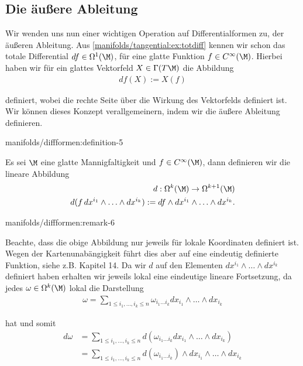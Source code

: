 \documentclass[letterpaper,10pt,german]{jupyterBook}
\begin{document}
\subsection{Die äußere Ableitung}
\label{\detokenize{manifolds/diffformen:die-auszere-ableitung}}
\par
Wir wenden uns nun einer wichtigen Operation auf Differentialformen zu, der äußeren Ableitung. Aus \cref{manifolds/tangential:ex:totdiff} kennen wir schon das totale Differential \(df\in \Omega^1(\M)\), für eine glatte Funktion \(f\in C^\infty(\M)\). Hierbei haben wir für ein glattes Vektorfeld \(X\in \Gamma(T\M)\) die Abbildung
\begin{align*}
df(X) := X(f)
\end{align*}
\par
definiert, wobei die rechte Seite über die Wirkung des Vektorfelds definiert ist. Wir können dieses Konzept verallgemeinern, indem wir die äußere Ableitung definieren.
\begin{definition}{}{manifolds/diffformen:definition-5}



\par
Es sei \(\M\) eine glatte Mannigfaltigkeit und \(f\in C^\infty(\M)\), dann definieren wir die lineare Abbildung
\begin{align*}
d:\Omega^k(\M)\to \Omega^{k+1}(\M)\\
d(f\, dx^{i_1}\wedge\ldots\wedge dx^{i_k}):= df \wedge dx^{i_1}\wedge\ldots\wedge dx^{i_k}.
\end{align*}\end{definition}
\begin{remark}{}{manifolds/diffformen:remark-6}



\par
Beachte, dass die obige Abbildung nur jeweils für lokale Koordinaten definiert ist. Wegen der Kartenunabängigkeit führt dies aber auf eine eindeutig definierte Funktion, siehe z.B. \cite{Lee03} Kapitel 14. Da wir \(d\) auf den Elementen \(dx^{i_1}\wedge\ldots\wedge dx^{i_k}\) definiert haben erhalten wir jeweils lokal eine eindeutige lineare Fortsetzung, da jedes \(\omega\in \Omega^k(\M)\) lokal die Darstellung
\begin{align*}
\omega = \sum_{1\leq i_1,\ldots,i_k \leq n}\omega_{i_1\ldots i_k}
dx_{i_1}\wedge\ldots\wedge dx_{i_k}
\end{align*}
\par
hat und somit
\begin{align*}
d\omega &= \sum_{1\leq i_1,\ldots,i_k \leq n} d(\omega_{i_1\ldots i_k}
dx_{i_1}\wedge\ldots\wedge dx_{i_k})\\ 
&= \sum_{1\leq i_1,\ldots,i_k \leq n} d(\omega_{i_1\ldots i_k})\wedge
dx_{i_1}\wedge\ldots\wedge dx_{i_k}
\end{align*}\end{remark}
\end{document}
